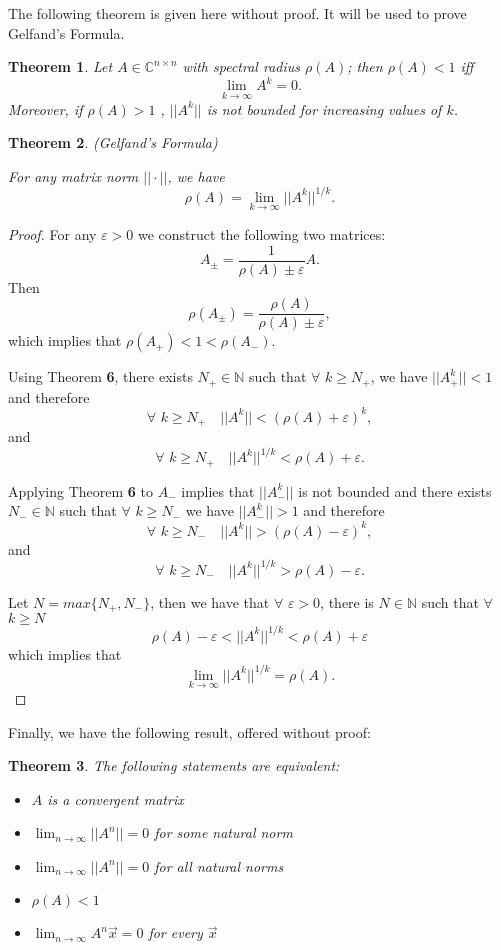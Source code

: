 \documentclass[12pt]{article}
\newcommand{\vecx}{\ensuremath{\vec{x}}}
\newtheorem{theorem}{Theorem}
\begin{document}
\vspace*{1em}

The following theorem is given here without proof. It will be used to prove Gelfand's Formula.
\begin{theorem}
Let $A\in \mathbb{C}^{n\times n}$ with spectral radius $\rho(A)$; then $\rho(A)<1$ iff
\[
\lim_{k\rightarrow\infty} A^k = 0.
\]
Moreover, if $\rho(A)>1$ , $||A^k||$ is not bounded for increasing values of $k$.
\end{theorem}

\begin{theorem}
(Gelfand's Formula)

For any matrix norm $||\cdot||$, we have
\[
\rho(A) = \lim_{k\rightarrow\infty} ||A^k||^{1/k}.
\]
\end{theorem}
\begin{proof}
For any $\varepsilon>0$ we construct the following two matrices:
\[
A_{\pm} = \frac{1}{\rho(A)\pm\varepsilon}A.
\]
Then
\[
\rho(A_{\pm}) = \frac{\rho(A)}{\rho(A)\pm\varepsilon},
\]
which implies that $\rho(A_+) < 1 < \rho(A_-)$.

Using Theorem \textbf{6}, there exists $N_+ \in \mathbb{N}$ such that $\forall$ $k\geq N_+$, we have $||A_+^k|| <1$ and therefore
\[
\forall\,\, k \geq N_+ \quad ||A^k|| < (\rho(A)+\varepsilon)^k,
\]
and
\[
\forall\,\, k \geq N_+ \quad ||A^k||^{1/k} < \rho(A)+\varepsilon.
\]

Applying Theorem \textbf{6} to $A_-$ implies that $||A_-^k||$ is not bounded and there exists $N_- \in \mathbb{N}$ such that $\forall$ $k\geq N_-$ we have $||A_-^k|| >1$ and therefore 
\[
\forall\,\, k \geq N_- \quad ||A^k|| > (\rho(A)-\varepsilon)^k,
\]
and
\[
\forall\,\, k \geq N_- \quad ||A^k||^{1/k} > \rho(A)-\varepsilon.
\]

Let $N = max\{N_+,N_-\}$, then we have that $\forall$ $\varepsilon>0$, there is $N\in\mathbb{N}$ such that $\forall$ $k\geq N$
\[
\rho(A)-\varepsilon < ||A^k||^{1/k} < \rho(A) + \varepsilon
\]
which implies that
\[
\lim_{k\rightarrow\infty}||A^k||^{1/k} = \rho(A).
\]
\end{proof}

Finally, we have the following result, offered without proof:
\begin{theorem}
The following statements are equivalent:
\begin{itemize}
\item[a.] $A$ is a convergent matrix
\item[b.] $\displaystyle{\lim_{n\rightarrow\infty}}||A^n|| = 0$ for some natural norm\item[c.] $\displaystyle{\lim_{n\rightarrow\infty}}||A^n|| = 0$ for all natural norms
\item[d.] $\rho(A)<1$
\item[e.] $\displaystyle{\lim_{n\rightarrow\infty}}A^n\vecx = 0$ for every $\vecx$
\end{itemize}
\end{theorem}
\end{document}
